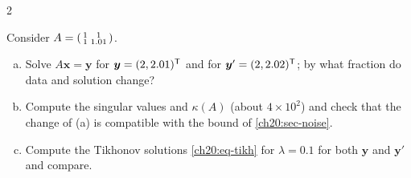 \begin{paracol}{2}
\begin{exercise}
Consider $A=\begin{psmallmatrix}1&1\\1&1.01\end{psmallmatrix}$.
\begin{enumerate}[(a)]
  \item Solve $A\bm x=\bm y$ for $\bm y=(2,2.01)^{\mathsf T}$ and for $\bm y'=(2,2.02)^{\mathsf T}$; by what fraction do data and solution change?
  \item Compute the singular values and $\kappa(A)$ (about $4\times10^2$) and
      check that the change of (a) is compatible with the bound of \cref{ch20:sec-noise}.
  \item Compute the Tikhonov solutions \eqref{ch20:eq-tikh} for $\lambda=0.1$ for both $\bm y$ and $\bm y'$ and compare.
\end{enumerate}
\end{exercise}


\end{paracol}
